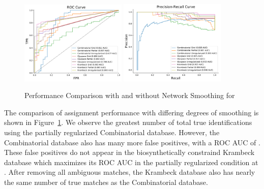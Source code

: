     \begin{figure}[htb]
        \caption{Performance Comparison with and without Network Smoothing for \rpserum
                 \label{fig:rpserum_perf}}
        \centering
        \includegraphics[width=0.45\textwidth,valign=t]{figure/serum_roc.pdf}
        \includegraphics[width=0.45\textwidth,valign=t]{figure/serum_prec_rec.pdf}
    \end{figure}

    The comparison of assignment performance with differing degrees of smoothing is
    shown in Figure~\ref{fig:rpserum_perf}. We observe the greatest number of total true
    identifications using the partially regularized Combinatorial database. However, the
    Combinatorial database also has many more false positives, with a ROC AUC of \SerumCombinatorialPartialROCAUC.
    These false positives do not appear in the biosynthetically constraind Krambeck database
    which maximizes its ROC AUC in the partially regularized condition at \SerumKrambeckPartialROCAUC.
    After removing all ambiguous matches, the Krambeck database also has nearly the same
    number of true matches as the Combinatorial database.

